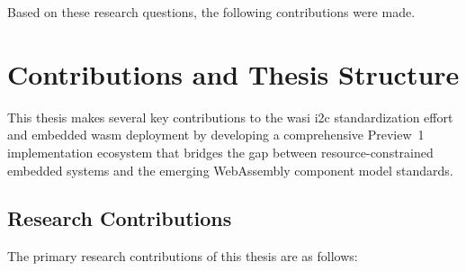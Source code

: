 Based on these research questions, the following contributions were made.






\section{Contributions and Thesis Structure}
\label{sec:contributions-structure}

This thesis makes several key contributions to the \acrshort{wasi} \acrshort{i2c} standardization effort and embedded \acrshort{wasm} deployment by developing a comprehensive Preview~1 implementation ecosystem that bridges the gap between resource-constrained embedded systems and the emerging WebAssembly component model standards.

\subsection{Research Contributions}
\label{subsec:research-contributions}

The primary research contributions of this thesis are as follows:


